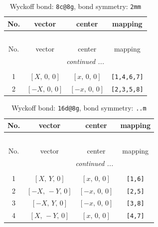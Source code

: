 \documentclass[fleqn,8pt]{jsarticle}
\begin{document}
\begin{longtable}{cccc}
\caption{Wyckoff bond: {\tt 8c@8g}, bond symmetry: {\tt 2mm}}
 \\
 \hline \hline
No. & vector & center & mapping \\ \hline \endfirsthead

\multicolumn{3}{l}{\tablename\ \thetable{}} \\
 \hline \hline
No. & vector & center & mapping \\ \hline \endhead

 \hline \hline
\multicolumn{3}{r}{\footnotesize\it continued ...} \\ \endfoot

 \hline \hline
\multicolumn{3}{r}{} \\ \endlastfoot

1 & $\left[ X,\, 0,\, 0 \right]$ & $\left[ x,\, 0,\, 0 \right]$ & {\tt [1,4,6,7]} \\ \hline
2 & $\left[ - X,\, 0,\, 0 \right]$ & $\left[ - x,\, 0,\, 0 \right]$ & {\tt [2,3,5,8]} \\
\end{longtable}
\renewcommand{\arraystretch}{1.2}
\begin{longtable}{cccc}
\caption{Wyckoff bond: {\tt 16d@8g}, bond symmetry: {\tt ..m}}
 \\
 \hline \hline
No. & vector & center & mapping \\ \hline \endfirsthead

\multicolumn{3}{l}{\tablename\ \thetable{}} \\
 \hline \hline
No. & vector & center & mapping \\ \hline \endhead

 \hline \hline
\multicolumn{3}{r}{\footnotesize\it continued ...} \\ \endfoot

 \hline \hline
\multicolumn{3}{r}{} \\ \endlastfoot

1 & $\left[ X,\, Y,\, 0 \right]$ & $\left[ x,\, 0,\, 0 \right]$ & {\tt [1,6]} \\ \hline
2 & $\left[ - X,\, - Y,\, 0 \right]$ & $\left[ - x,\, 0,\, 0 \right]$ & {\tt [2,5]} \\ \hline
3 & $\left[ - X,\, Y,\, 0 \right]$ & $\left[ - x,\, 0,\, 0 \right]$ & {\tt [3,8]} \\ \hline
4 & $\left[ X,\, - Y,\, 0 \right]$ & $\left[ x,\, 0,\, 0 \right]$ & {\tt [4,7]} \\
\end{longtable}
\end{document}
